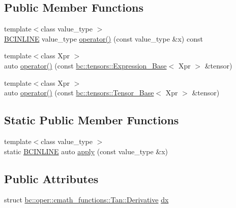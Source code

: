 \subsection*{Public Member Functions}
\begin{DoxyCompactItemize}
\item 
{\footnotesize template$<$class value\+\_\+type $>$ }\\\hyperlink{common_8h_a6699e8b0449da5c0fafb878e59c1d4b1}{B\+C\+I\+N\+L\+I\+NE} value\+\_\+type \hyperlink{structbc_1_1oper_1_1cmath__functions_1_1Tan_a45cc3c54fc8492269e08be72e678e774}{operator()} (const value\+\_\+type \&x) const
\item 
{\footnotesize template$<$class Xpr $>$ }\\auto \hyperlink{structbc_1_1oper_1_1cmath__functions_1_1Tan_aa3174f39838e9ef3c0c05c095956f129}{operator()} (const \hyperlink{classbc_1_1tensors_1_1Expression__Base}{bc\+::tensors\+::\+Expression\+\_\+\+Base}$<$ Xpr $>$ \&tensor)
\item 
{\footnotesize template$<$class Xpr $>$ }\\auto \hyperlink{structbc_1_1oper_1_1cmath__functions_1_1Tan_a50f4439cd26a0ac9542e9087678abb03}{operator()} (const \hyperlink{classbc_1_1tensors_1_1Tensor__Base}{bc\+::tensors\+::\+Tensor\+\_\+\+Base}$<$ Xpr $>$ \&tensor)
\end{DoxyCompactItemize}
\subsection*{Static Public Member Functions}
\begin{DoxyCompactItemize}
\item 
{\footnotesize template$<$class value\+\_\+type $>$ }\\static \hyperlink{common_8h_a6699e8b0449da5c0fafb878e59c1d4b1}{B\+C\+I\+N\+L\+I\+NE} auto \hyperlink{structbc_1_1oper_1_1cmath__functions_1_1Tan_aff655c2e28a1ded1f09716cd48663c7c}{apply} (const value\+\_\+type \&x)
\end{DoxyCompactItemize}
\subsection*{Public Attributes}
\begin{DoxyCompactItemize}
\item 
struct \hyperlink{structbc_1_1oper_1_1cmath__functions_1_1Tan_1_1Derivative}{bc\+::oper\+::cmath\+\_\+functions\+::\+Tan\+::\+Derivative} \hyperlink{structbc_1_1oper_1_1cmath__functions_1_1Tan_a66fb4e7892aaed9f17a504186b87b7ab}{dx}
\end{DoxyCompactItemize}



